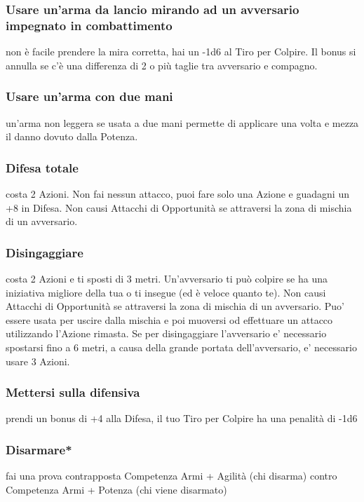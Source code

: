 \documentclass[a4paper,11pt,twoside,openany]{book}
\begin{document}
\subsubsection{Usare un'arma da lancio mirando ad un avversario impegnato
	in combattimento} non è facile prendere la mira corretta, hai un -1d6 al Tiro per Colpire. Il bonus si annulla se c'è una differenza di 2 o più taglie tra avversario e compagno.

\subsubsection{Usare un'arma con due mani} un'arma non leggera se usata a due mani permette di applicare una volta e mezza il danno dovuto dalla Potenza.

\subsubsection{Difesa totale} costa 2 Azioni. Non fai nessun attacco, puoi fare solo una Azione e guadagni un +8 in Difesa. Non causi Attacchi di Opportunità se attraversi la zona di mischia di un avversario.

\subsubsection{Disingaggiare} costa 2 Azioni e ti sposti di 3 metri. Un'avversario ti può colpire se ha una iniziativa migliore della tua o ti insegue (ed è veloce quanto te). Non causi Attacchi di Opportunità se attraversi la zona di mischia di un avversario. Puo' essere usata per uscire dalla mischia e poi muoversi od effettuare un attacco utilizzando l'Azione rimasta.
Se per disingaggiare l'avversario e' necessario spostarsi fino a 6 metri, a causa della grande portata dell'avversario, e' necessario usare 3 Azioni.

\subsubsection{Mettersi sulla difensiva} prendi un bonus di +4 alla Difesa, il tuo Tiro per Colpire ha una penalità di -1d6

\subsubsection{Disarmare*} fai una prova contrapposta Competenza Armi + Agilità (chi disarma) contro Competenza Armi + Potenza (chi viene disarmato)
\end{document}
